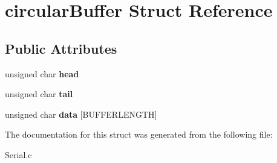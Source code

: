 \hypertarget{structcircular_buffer}{\section{circular\+Buffer Struct Reference}
\label{structcircular_buffer}
}
\subsection*{Public Attributes}
\begin{DoxyCompactItemize}
\item 
\hypertarget{structcircular_buffer_a409f0bfe51ee78c6079d02e1c91805b4}{unsigned char {\bfseries head}}\label{structcircular_buffer_a409f0bfe51ee78c6079d02e1c91805b4}

\item 
\hypertarget{structcircular_buffer_acd38209ec43493d0bad205958a0dc264}{unsigned char {\bfseries tail}}\label{structcircular_buffer_acd38209ec43493d0bad205958a0dc264}

\item 
\hypertarget{structcircular_buffer_a8e56ebe2b2b92b078f4a3fcd9fd82063}{unsigned char {\bfseries data} \mbox{[}B\+U\+F\+F\+E\+R\+L\+E\+N\+G\+T\+H\mbox{]}}\label{structcircular_buffer_a8e56ebe2b2b92b078f4a3fcd9fd82063}

\end{DoxyCompactItemize}


The documentation for this struct was generated from the following file\+:\begin{DoxyCompactItemize}
\item 
Serial.\+c\end{DoxyCompactItemize}
